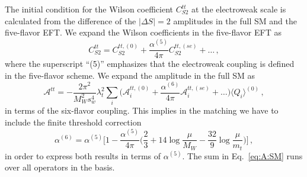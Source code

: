 \documentclass[letter,11pt,DIV=12,abstract=true,numbers=noenddot,titlepage=false,twocolumn=false,draft=false]{scrartcl}
\begin{document}
The initial condition for the Wilson coefficient $C_{S2}^{tt}$ at the
electroweak scale is calculated from the difference of the $|\Delta S|
= 2$ amplitudes in the full SM and the five-flavor EFT. We expand the
Wilson coefficients in the five-flavor EFT as
\begin{equation}\label{eq:expand:C}
  C_{S2}^{tt}
= C_{S2}^{tt,(0)}
  + \frac{\alpha^{(5)}}{4\pi} C_{S2}^{tt,(se)} + \ldots \,,
\end{equation}
where the superscript ``(5)'' emphasizes that the electroweak coupling
is defined in the five-flavor scheme. We expand the amplitude in the
full SM as
\begin{equation}\label{eq:A:SM}
{\mathcal A}^{tt}
 = - \frac{2\pi^2}{M_W^2 s_w^4} \lambda_t^2
   \sum_i \bigg( {\mathcal A}_{i}^{tt,(0)}
   + \frac{\alpha^{(6)}}{4\pi} {\mathcal A}_{i}^{tt,(se)} + \ldots
   \bigg) \langle Q_{i} \rangle^{(0)} \,,
\end{equation}
in terms of the six-flavor coupling. This implies in the matching we
have to include the finite threshold correction~\cite{Bobeth:2013tba}
\begin{equation}
  \alpha^{(6)} = \alpha^{(5)} \bigg[ 1 - \frac{\alpha^{(5)}}{4\pi}
                \bigg( \frac{2}{3} + 14 \log\frac{\mu}{M_W}
                       - \frac{32}{9} \log\frac{\mu}{m_t} \bigg) \bigg] \,,
\end{equation}
in order to express both results in terms of $\alpha^{(5)}$. The sum
in Eq.~\eqref{eq:A:SM} runs over all operators in the basis.
\end{document}
